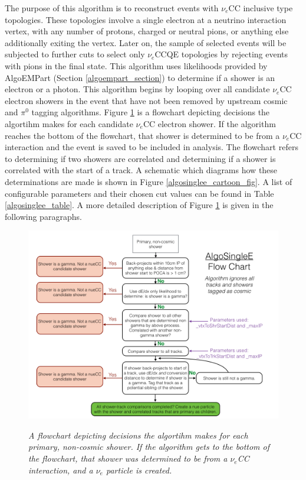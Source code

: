 The purpose of this algorithm is to reconstruct events with $\nu_e$CC inclusive type topologies. These topologies involve a single electron at a neutrino interaction vertex, with any number of protons, charged or neutral pions, or anything else additionally exiting the vertex. Later on, the sample of selected events will be subjected to further cuts to select only $\nu_e$CCQE topologies by rejecting events with pions in the final state. This algorithm uses likelihoods provided by AlgoEMPart (Section \ref{algoempart_section}) to determine if a shower is an electron or a photon. This algorithm begins by looping over all candidate $\nu_e$CC electron showers in the event that have not been removed by upstream cosmic and $\pi^0$ tagging algorithms. Figure \ref{algosinglee_flowchart_fig} is a flowchart depicting decisions the algortihm makes for each candidate $\nu_e$CC electron shower. If the algorithm reaches the bottom of the flowchart, that shower is determined to be from a $\nu_e$CC interaction and the event is saved to be included in analysis. The flowchart refers to determining if two showers are correlated and determining if a shower is correlated with the start of a track. A schematic which diagrams how these determinations are made is shown in Figure \ref{algosinglee_cartoon_fig}. A list of configurable parameters and their chosen cut values can be found in Table \ref{algosinglee_table}. A more detailed description of Figure \ref{algosinglee_flowchart_fig} is given in the following paragraphs.\\


\begin{figure}[ht!]
\centering
\includegraphics[width=150mm]{Figures/algosinglee_flowchart.png}\\
\caption{\textit{A flowchart depicting decisions the algortihm makes for each primary, non-cosmic shower. If the algorithm gets to the bottom of the flowchart, that shower was determined to be from a $\nu_e$CC interaction, and a $\nu_e$ particle is created.}}
\label{algosinglee_flowchart_fig}
\end{figure}

